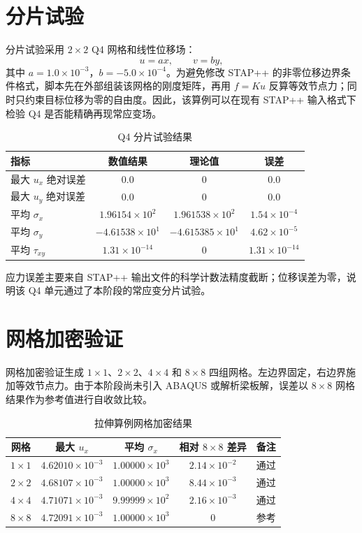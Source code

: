 ﻿\documentclass[UTF8,11pt,a4paper]{ctexart}
\begin{document}
\section{分片试验}
分片试验采用 $2\times2$ Q4 网格和线性位移场：
\begin{equation}
u=a x,\qquad v=b y,
\end{equation}
其中 $a=1.0\times10^{-3}$，$b=-5.0\times10^{-4}$。为避免修改 STAP++ 的非零位移边界条件格式，脚本先在外部组装该网格的刚度矩阵，再用 $f=Ku$ 反算等效节点力；同时只约束目标位移为零的自由度。因此，该算例可以在现有 STAP++ 输入格式下检验 Q4 是否能精确再现常应变场。

\begin{table}[h]
\centering
\caption{Q4 分片试验结果}
\begin{tabular}{lccc}
\toprule
指标 & 数值结果 & 理论值 & 误差 \\
\midrule
最大 $u_x$ 绝对误差 & $0.0$ & $0$ & $0.0$ \\
最大 $u_y$ 绝对误差 & $0.0$ & $0$ & $0.0$ \\
平均 $\sigma_x$ & $1.96154\times10^2$ & $1.961538\times10^2$ & $1.54\times10^{-4}$ \\
平均 $\sigma_y$ & $-4.61538\times10^1$ & $-4.615385\times10^1$ & $4.62\times10^{-5}$ \\
平均 $\tau_{xy}$ & $1.31\times10^{-14}$ & $0$ & $1.31\times10^{-14}$ \\
\bottomrule
\end{tabular}
\end{table}

应力误差主要来自 STAP++ 输出文件的科学计数法精度截断；位移误差为零，说明该 Q4 单元通过了本阶段的常应变分片试验。

\section{网格加密验证}
网格加密验证生成 $1\times1$、$2\times2$、$4\times4$ 和 $8\times8$ 四组网格。左边界固定，右边界施加等效节点力。由于本阶段尚未引入 ABAQUS 或解析梁板解，误差以 $8\times8$ 网格结果作为参考值进行自收敛比较。

\begin{table}[h]
\centering
\caption{拉伸算例网格加密结果}
\begin{tabular}{ccccc}
\toprule
网格 & 最大 $u_x$ & 平均 $\sigma_x$ & 相对 $8\times8$ 差异 & 备注 \\
\midrule
$1\times1$ & $4.62010\times10^{-3}$ & $1.00000\times10^3$ & $2.14\times10^{-2}$ & 通过 \\
$2\times2$ & $4.68107\times10^{-3}$ & $1.00000\times10^3$ & $8.44\times10^{-3}$ & 通过 \\
$4\times4$ & $4.71071\times10^{-3}$ & $9.99999\times10^2$ & $2.16\times10^{-3}$ & 通过 \\
$8\times8$ & $4.72091\times10^{-3}$ & $1.00000\times10^3$ & $0$ & 参考 \\
\bottomrule
\end{tabular}
\end{table}
\end{document}
